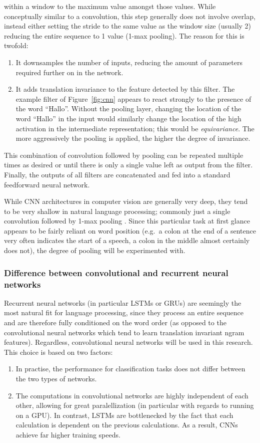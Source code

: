 within a window to the maximum value amongst those values. While conceptually
similar to a convolution, this step generally does not involve overlap, instead
either setting the stride to the same value as the window size (usually 2)
reducing the entire sequence to 1 value (1-max pooling). The reason for this is
twofold:
\begin{enumerate}
\item It downsamples the number of inputs, reducing the amount of parameters
  required further on in the network.
\item It adds translation invariance to the feature detected by this filter. The
  example filter of Figure~\ref{fig:cnn} appears to react strongly to the
  presence of the word ``Hallo''. Without the pooling layer, changing the
  location of the word ``Hallo'' in the input would similarly change the
  location of the high activation in the intermediate representation; this would
  be \emph{equivariance}. The more aggressively the pooling is applied, the
  higher the degree of invariance.
\end{enumerate}
This combination of convolution followed by pooling can be repeated multiple
times as desired or until there is only a single value left as output from the
filter. Finally, the outputs of all filters are concatenated and fed into a
standard feedforward neural network.

While CNN architectures in computer vision are generally very deep, they tend to
be very shallow in natural language processing; commonly just a single
convolution followed by 1-max pooling \citep{zhang2015conv}. Since this
particular task at first glance appears to be fairly reliant on word position
(e.g.\ a colon at the end of a sentence very often indicates the start of a
speech, a colon in the middle almost certainly does not), the degree of pooling
will be experimented with.

\subsubsection{Difference between convolutional and recurrent neural networks}
Recurrent neural networks (in particular LSTMs or GRUs) are seemingly the most
natural fit for language processing, since they process an entire sequence and
are therefore fully conditioned on the word order (as opposed to the
convolutional neural networks which tend to learn translation invariant ngram
features). Regardless, convolutional neural networks will be used in this
research. This choice is based on two factors:
\begin{enumerate}
\item In practise, the performance for classification tasks does not differ
  between the two types of networks.\citep{cnnrnn}
\item The computations in convolutional networks are highly independent of
  each other, allowing for great paralellization (in particular with regards to
  running on a GPU). In contrast, LSTMs are bottlenecked by the fact that each
  calculation is dependent on the previous calculations. As a result, CNNs
  achieve far higher training speeds.\citep{facebook}
\end{enumerate}

